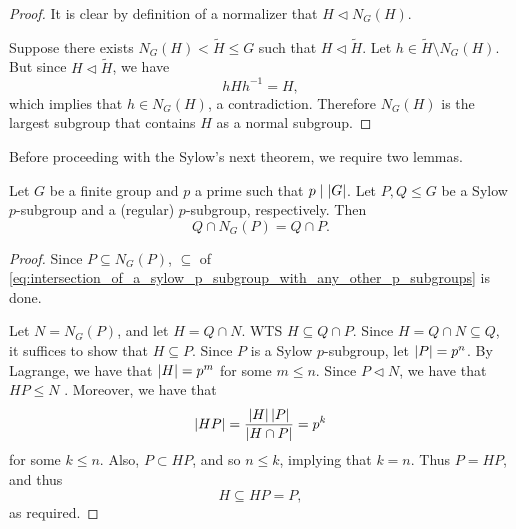 \documentclass[notoc,notitlepage]{tufte-book}
\begin{document}
\begin{proof}
  It is clear by definition of a normalizer that $H \triangleleft N_G(H)$.

  Suppose there exists $N_G(H) < \tilde{H} \leq G$ such that
  $H \triangleleft \tilde{H}$. Let $h \in \tilde{H} \setminus N_G(H)$.
  But since $H \triangleleft \tilde{H}$, we have
  \begin{equation*}
    hHh^{-1} = H,
  \end{equation*}
  which implies that $h \in N_G(H)$, a contradiction.
  Therefore $N_G(H)$ is the largest subgroup that contains $H$ as a
  normal subgroup.
\end{proof}

Before proceeding with the Sylow's next theorem, we require two lemmas.

\begin{lemma}\label{lemma:intersection_of_a_sylow_p_subgroup_with_any_other_p_subgroups}
  Let $G$ be a finite group and $p$ a prime such that $p \mid \left|G\right|$.
  Let $P, Q \leq G$ be a Sylow $p$-subgroup and a (regular) $p$-subgroup,
  respectively. Then
  \begin{equation}\label{eq:intersection_of_a_sylow_p_subgroup_with_any_other_p_subgroups}
    Q \cap N_G(P) = Q \cap P.
  \end{equation}
\end{lemma}

\begin{proof}
  Since $P \subseteq N_G(P)$, $\subseteq$ of \cref{eq:intersection_of_a_sylow_p_subgroup_with_any_other_p_subgroups} is done.

  Let $N = N_G(P)$, and let $H = Q \cap N$. WTS $H \subseteq Q \cap P$.
  Since $H = Q \cap N \subseteq Q$, it suffices to show that $H \subseteq P$.
  Since $P$ is a Sylow $p$-subgroup, let $\left|P\right| = p^n$. By Lagrange,
  we have that $\left|H\right| = p^m$ for some $m \leq n$. Since $P \triangleleft N$,
  we have that $HP \leq N$ 
  .
  Moreover, we have that
  \begin{equation*}
    \left|HP\right| = \frac{\left|H\right|\left|P\right|}{\left|H \cap P\right|} = p^k
  \end{equation*}
  for some $k \leq n$. Also, $P \subset HP$, and so $n \leq k$,
  implying that $k = n$. Thus $P = HP$, and thus
  \begin{equation*}
    H \subseteq HP = P,
  \end{equation*}
  as required.
\end{proof}
\end{document}

